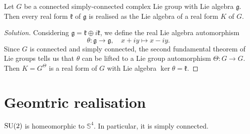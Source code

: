 \documentclass{report}
\begin{document}
\begin{exercise}[Exercise 3.15]
    Let $G$ be a connected simply-connected complex Lie group with Lie algebra $\mathfrak g$.
    Then every real form $\mathfrak k$ of $\mathfrak g$ is realised as the Lie algebra of a real form $K$ of $G$.
\end{exercise}
\begin{proof}[Solution]
    Considering $\mathfrak g = \mathfrak k \oplus i \mathfrak k$, we define the real Lie algebra automorphism
    \[
    \theta: \mathfrak g \to \mathfrak g, \quad x + iy \mapsto x - iy.
    \]
    Since $G$ is connected and simply connected, the second fundamental theorem of Lie groups tells us that $\theta$ can be lifted to a Lie group automorphism $\Theta: G \to G$.
    Then $K = G^\Theta$ is a real form of $G$ with Lie algebra $\ker \theta = \mathfrak k$.
\end{proof}

\chapter{Geomtric realisation}

\begin{proposition}
    $\operatorname{{\mathrm{SU}}}(2)$ is homeomorphic to $\mathbb S^4$.
    In particular, it is simply connected.
\end{proposition}
\end{document}
